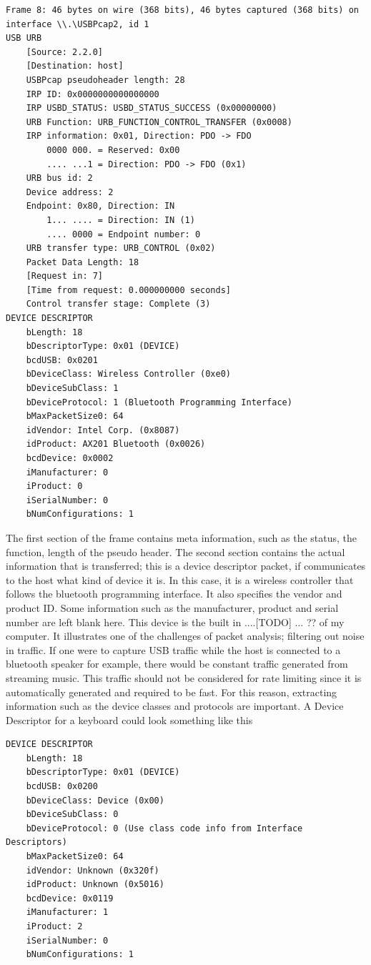 \begin{lstlisting}
Frame 8: 46 bytes on wire (368 bits), 46 bytes captured (368 bits) on interface \\.\USBPcap2, id 1
USB URB
    [Source: 2.2.0]
    [Destination: host]
    USBPcap pseudoheader length: 28
    IRP ID: 0x0000000000000000
    IRP USBD_STATUS: USBD_STATUS_SUCCESS (0x00000000)
    URB Function: URB_FUNCTION_CONTROL_TRANSFER (0x0008)
    IRP information: 0x01, Direction: PDO -> FDO
        0000 000. = Reserved: 0x00
        .... ...1 = Direction: PDO -> FDO (0x1)
    URB bus id: 2
    Device address: 2
    Endpoint: 0x80, Direction: IN
        1... .... = Direction: IN (1)
        .... 0000 = Endpoint number: 0
    URB transfer type: URB_CONTROL (0x02)
    Packet Data Length: 18
    [Request in: 7]
    [Time from request: 0.000000000 seconds]
    Control transfer stage: Complete (3)
DEVICE DESCRIPTOR
    bLength: 18
    bDescriptorType: 0x01 (DEVICE)
    bcdUSB: 0x0201
    bDeviceClass: Wireless Controller (0xe0)
    bDeviceSubClass: 1
    bDeviceProtocol: 1 (Bluetooth Programming Interface)
    bMaxPacketSize0: 64
    idVendor: Intel Corp. (0x8087)
    idProduct: AX201 Bluetooth (0x0026)
    bcdDevice: 0x0002
    iManufacturer: 0
    iProduct: 0
    iSerialNumber: 0
    bNumConfigurations: 1
\end{lstlisting}

The first section of the frame contains meta information, such as the status, the function, length of the pseudo header. The second section contains the actual information that is transferred;
this is a device descriptor packet, if communicates to the host what kind of device it is. In this case, it is a wireless controller that follows the bluetooth programming interface. It also specifies the
vendor and product ID. Some information such as the manufacturer, product and serial number are left blank here.
This device is the built in  ....[TODO] ... ?? of my computer. It illustrates one of the challenges of packet analysis; filtering out noise in traffic. If one were to capture USB traffic while the host is connected to a bluetooth
speaker for example, there would be constant traffic generated from streaming music. This traffic should not be considered for rate limiting since it is automatically generated and required to be fast.
For this reason, extracting information such as the device classes and protocols are important. A Device Descriptor for a keyboard could look something like this


\begin{lstlisting}
DEVICE DESCRIPTOR
    bLength: 18
    bDescriptorType: 0x01 (DEVICE)
    bcdUSB: 0x0200
    bDeviceClass: Device (0x00)
    bDeviceSubClass: 0
    bDeviceProtocol: 0 (Use class code info from Interface Descriptors)
    bMaxPacketSize0: 64
    idVendor: Unknown (0x320f)
    idProduct: Unknown (0x5016)
    bcdDevice: 0x0119
    iManufacturer: 1
    iProduct: 2
    iSerialNumber: 0
    bNumConfigurations: 1
\end{lstlisting}


